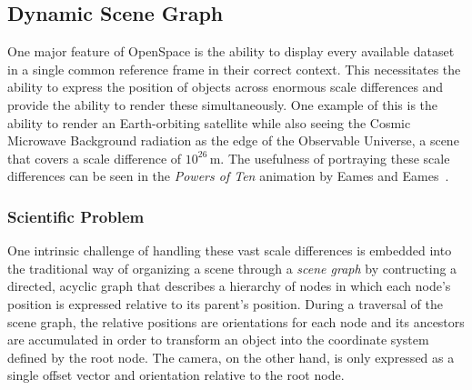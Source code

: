 \subsection{Dynamic Scene Graph} \label{contributions:astro:dsg}
One major feature of OpenSpace is the ability to display every available dataset in a single common reference frame in their correct context.  This necessitates the ability to express the position of objects across enormous scale differences and provide the ability to render these simultaneously.  One example of this is the ability to render an Earth-orbiting satellite while also seeing the Cosmic Microwave Background radiation as the edge of the Observable Universe, a scene that covers a scale difference of $10^{26}\,$m.  The usefulness of portraying these scale differences can be seen in the \emph{Powers of Ten} animation by Eames and Eames~\cite{morrison1982powers}.

\subsubsection{Scientific Problem} \label{contributions:astro:dsg:problem}

One intrinsic challenge of handling these vast scale differences is embedded into the traditional way of organizing a scene through a \emph{scene graph} by contructing a directed, acyclic graph that describes a hierarchy of nodes in which each node's position is expressed relative to its parent's position.  During a traversal of the scene graph, the relative positions are orientations for each node and its ancestors are accumulated in order to transform an object into the coordinate system defined by the root node.  The camera, on the other hand, is only expressed as a single offset vector and orientation relative to the root node.  

